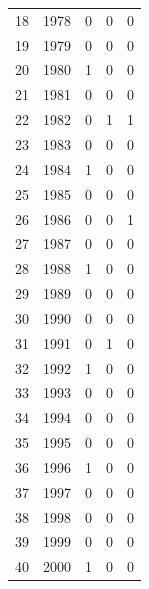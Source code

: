 \documentclass[polish, twoside, 12pt, a4paper]{article}
\theoremstyle{definition}
\theoremstyle{plain}
\theoremstyle{remark}
\begin{document}
\begin{longtable}{rrrrr}
  18    & 1978 & 0      & 0       & 0                                 \\ 
  19    & 1979 & 0      & 0       & 0                                 \\ 
  20    & 1980 & 1      & 0       & 0                                 \\ 
  21    & 1981 & 0      & 0       & 0                                 \\ 
  22    & 1982 & 0      & 1       & 1                                 \\ 
  23    & 1983 & 0      & 0       & 0                                 \\ 
  24    & 1984 & 1      & 0       & 0                                 \\ 
  25    & 1985 & 0      & 0       & 0                                 \\ 
  26    & 1986 & 0      & 0       & 1                                 \\ 
  27    & 1987 & 0      & 0       & 0                                 \\ 
  28    & 1988 & 1      & 0       & 0                                 \\ 
  29    & 1989 & 0      & 0       & 0                                 \\ 
  30    & 1990 & 0      & 0       & 0                                 \\ 
  31    & 1991 & 0      & 1       & 0                                 \\ 
  32    & 1992 & 1      & 0       & 0                                 \\ 
  33    & 1993 & 0      & 0       & 0                                 \\ 
  34    & 1994 & 0      & 0       & 0                                 \\ 
  35    & 1995 & 0      & 0       & 0                                 \\ 
  36    & 1996 & 1      & 0       & 0                                 \\ 
  37    & 1997 & 0      & 0       & 0                                 \\ 
  38    & 1998 & 0      & 0       & 0                                 \\ 
  39    & 1999 & 0      & 0       & 0                                 \\ 
  40    & 2000 & 1      & 0       & 0                                 \\ 

\end{longtable}
\end{document}
